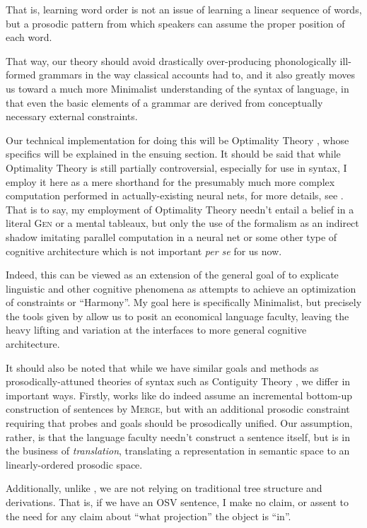 \documentclass{article}
\begin{document}
That is, learning word order is not an issue of learning a linear sequence of words, but a prosodic pattern from which speakers can assume the proper position of each word.

That way, our theory should avoid drastically over-producing phonologically ill-formed grammars in the way classical accounts had to, and it also greatly moves us toward a much more Minimalist understanding of the syntax of language, in that even the basic elements of a grammar are derived from conceptually necessary external constraints.

Our technical implementation for doing this will be Optimality Theory \parencite{prince93}, whose specifics will be explained in the ensuing section.
It should be said that while Optimality Theory is still partially controversial, especially for use in syntax, I employ it here as a mere shorthand for the presumably much more complex computation performed in actually-existing neural nets, for more details, see \textcite{prince97}.
That is to say, my employment of Optimality Theory needn't entail a belief in a literal {\textsc{Gen}} or a mental tableaux, but only the use of the formalism as an indirect shadow imitating parallel computation in a neural net or some other type of cognitive architecture which is not important \textit{per se} for us now.

Indeed, this can be viewed as an extension of the general goal of \textcite{smolensky06} to explicate linguistic and other cognitive phenomena as attempts to achieve an optimization of constraints or ``Harmony''.
My goal here is specifically Minimalist, but precisely the tools given by \textcite{smolensky06} allow us to posit an economical language faculty, leaving the heavy lifting and variation at the interfaces to more general cognitive architecture.

It should also be noted that while we have similar goals and methods as prosodically-attuned theories of syntax such as Contiguity Theory \parencite{richards16}, we differ in important ways.
Firstly, works like \textcite{richards10,richards16} do indeed assume an incremental bottom-up construction of sentences by \textsc{Merge}, but with an additional prosodic constraint requiring that probes and goals should be prosodically unified.
Our assumption, rather, is that the language faculty needn't construct a sentence itself, but is in the business of \textit{translation}, translating a representation in semantic space to an linearly-ordered prosodic space.

Additionally, unlike \textcite{richards16}, we are not relying on traditional tree structure and derivations.
That is, if we have an OSV sentence, I make no claim, or assent to the need for any claim about ``what projection'' the object is ``in''.
\end{document}
